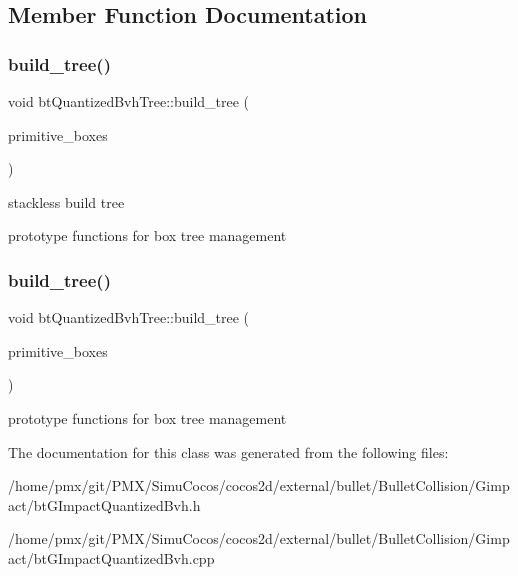 \subsection{Member Function Documentation}
\mbox{\label{classbtQuantizedBvhTree_aa2229fd3e3e2004cdf8151437535e936}} 
\subsubsection{\texorpdfstring{build\+\_\+tree()}{build\_tree()}\hspace{0.1cm}{\footnotesize\ttfamily [1/2]}}
{\footnotesize\ttfamily void bt\+Quantized\+Bvh\+Tree\+::build\+\_\+tree (\begin{DoxyParamCaption}\item[{\hyperlink{classGIM__BVH__DATA__ARRAY}{G\+I\+M\+\_\+\+B\+V\+H\+\_\+\+D\+A\+T\+A\+\_\+\+A\+R\+R\+AY} \&}]{primitive\+\_\+boxes }\end{DoxyParamCaption})}



stackless build tree 

prototype functions for box tree management \mbox{\label{classbtQuantizedBvhTree_aa2229fd3e3e2004cdf8151437535e936}} 
\subsubsection{\texorpdfstring{build\+\_\+tree()}{build\_tree()}\hspace{0.1cm}{\footnotesize\ttfamily [2/2]}}
{\footnotesize\ttfamily void bt\+Quantized\+Bvh\+Tree\+::build\+\_\+tree (\begin{DoxyParamCaption}\item[{\hyperlink{classGIM__BVH__DATA__ARRAY}{G\+I\+M\+\_\+\+B\+V\+H\+\_\+\+D\+A\+T\+A\+\_\+\+A\+R\+R\+AY} \&}]{primitive\+\_\+boxes }\end{DoxyParamCaption})}

prototype functions for box tree management 

The documentation for this class was generated from the following files\+:\begin{DoxyCompactItemize}
\item 
/home/pmx/git/\+P\+M\+X/\+Simu\+Cocos/cocos2d/external/bullet/\+Bullet\+Collision/\+Gimpact/bt\+G\+Impact\+Quantized\+Bvh.\+h\item 
/home/pmx/git/\+P\+M\+X/\+Simu\+Cocos/cocos2d/external/bullet/\+Bullet\+Collision/\+Gimpact/bt\+G\+Impact\+Quantized\+Bvh.\+cpp\end{DoxyCompactItemize}
